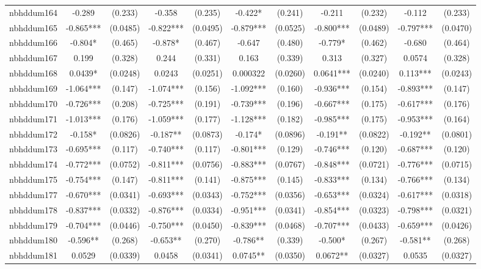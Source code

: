 \documentclass[]{article}
\begin{document}
\begin{tabular}{lcccccccccc}
nbhddum164 & -0.289 & (0.233) & -0.358 & (0.235) & -0.422* & (0.241) & -0.211 & (0.232) & -0.112 & (0.233) \\
nbhddum165 & -0.865*** & (0.0485) & -0.822*** & (0.0495) & -0.879*** & (0.0525) & -0.800*** & (0.0489) & -0.797*** & (0.0470) \\
nbhddum166 & -0.804* & (0.465) & -0.878* & (0.467) & -0.647 & (0.480) & -0.779* & (0.462) & -0.680 & (0.464) \\
nbhddum167 & 0.199 & (0.328) & 0.244 & (0.331) & 0.163 & (0.339) & 0.313 & (0.327) & 0.0574 & (0.328) \\
nbhddum168 & 0.0439* & (0.0248) & 0.0243 & (0.0251) & 0.000322 & (0.0260) & 0.0641*** & (0.0240) & 0.113*** & (0.0243) \\
nbhddum169 & -1.064*** & (0.147) & -1.074*** & (0.156) & -1.092*** & (0.160) & -0.936*** & (0.154) & -0.893*** & (0.147) \\
nbhddum170 & -0.726*** & (0.208) & -0.725*** & (0.191) & -0.739*** & (0.196) & -0.667*** & (0.175) & -0.617*** & (0.176) \\
nbhddum171 & -1.013*** & (0.176) & -1.059*** & (0.177) & -1.128*** & (0.182) & -0.985*** & (0.175) & -0.953*** & (0.164) \\
nbhddum172 & -0.158* & (0.0826) & -0.187** & (0.0873) & -0.174* & (0.0896) & -0.191** & (0.0822) & -0.192** & (0.0801) \\
nbhddum173 & -0.695*** & (0.117) & -0.740*** & (0.117) & -0.801*** & (0.129) & -0.746*** & (0.120) & -0.687*** & (0.120) \\
nbhddum174 & -0.772*** & (0.0752) & -0.811*** & (0.0756) & -0.883*** & (0.0767) & -0.848*** & (0.0721) & -0.776*** & (0.0715) \\
nbhddum175 & -0.754*** & (0.147) & -0.811*** & (0.141) & -0.875*** & (0.145) & -0.833*** & (0.134) & -0.766*** & (0.134) \\
nbhddum177 & -0.670*** & (0.0341) & -0.693*** & (0.0343) & -0.752*** & (0.0356) & -0.653*** & (0.0324) & -0.617*** & (0.0318) \\
nbhddum178 & -0.837*** & (0.0332) & -0.876*** & (0.0334) & -0.951*** & (0.0341) & -0.854*** & (0.0323) & -0.798*** & (0.0321) \\
nbhddum179 & -0.704*** & (0.0446) & -0.750*** & (0.0450) & -0.839*** & (0.0468) & -0.707*** & (0.0433) & -0.659*** & (0.0426) \\
nbhddum180 & -0.596** & (0.268) & -0.653** & (0.270) & -0.786** & (0.339) & -0.500* & (0.267) & -0.581** & (0.268) \\
nbhddum181 & 0.0529 & (0.0339) & 0.0458 & (0.0341) & 0.0745** & (0.0350) & 0.0672** & (0.0327) & 0.0535 & (0.0327) \\

\end{tabular}
\end{document}
